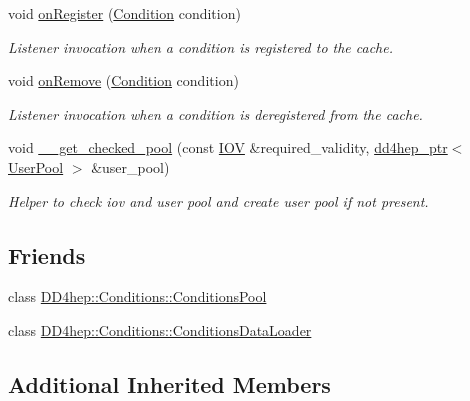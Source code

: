 \begin{DoxyCompactItemize}
void \hyperlink{class_d_d4hep_1_1_conditions_1_1_conditions_manager_object_a872970f1bb67a3d225be8c63422f848f}{on\+Register} (\hyperlink{class_d_d4hep_1_1_conditions_1_1_condition}{Condition} condition)
\begin{DoxyCompactList}\small\item\em Listener invocation when a condition is registered to the cache. \end{DoxyCompactList}\item 
void \hyperlink{class_d_d4hep_1_1_conditions_1_1_conditions_manager_object_adb550d80aca3b897f299530b4c4bfd0b}{on\+Remove} (\hyperlink{class_d_d4hep_1_1_conditions_1_1_condition}{Condition} condition)
\begin{DoxyCompactList}\small\item\em Listener invocation when a condition is deregistered from the cache. \end{DoxyCompactList}\item 
void \hyperlink{class_d_d4hep_1_1_conditions_1_1_conditions_manager_object_a4e7c5a6f766e182c7fcdcf766c28f9a0}{\+\_\+\+\_\+get\+\_\+checked\+\_\+pool} (const \hyperlink{class_d_d4hep_1_1_i_o_v}{I\+OV} \&required\+\_\+validity, \hyperlink{class_d_d4hep_1_1dd4hep__ptr}{dd4hep\+\_\+ptr}$<$ \hyperlink{class_d_d4hep_1_1_conditions_1_1_user_pool}{User\+Pool} $>$ \&user\+\_\+pool)
\begin{DoxyCompactList}\small\item\em Helper to check iov and user pool and create user pool if not present. \end{DoxyCompactList}\end{DoxyCompactItemize}
\subsection*{Friends}
\begin{DoxyCompactItemize}
\item 
class \hyperlink{class_d_d4hep_1_1_conditions_1_1_conditions_manager_object_ae399ab8adc57b6187de6a733d9fcfc73}{D\+D4hep\+::\+Conditions\+::\+Conditions\+Pool}
\item 
class \hyperlink{class_d_d4hep_1_1_conditions_1_1_conditions_manager_object_a967e35cec9ace4f5cfb821c8d1f86f0b}{D\+D4hep\+::\+Conditions\+::\+Conditions\+Data\+Loader}
\end{DoxyCompactItemize}
\subsection*{Additional Inherited Members}


